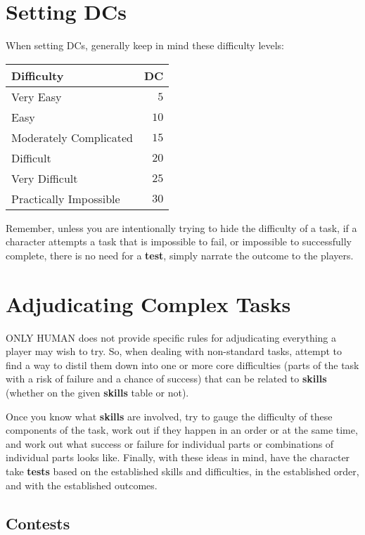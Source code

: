 \documentclass[11pt]{article}
\begin{document}
\begin{multicols}{3}
  \section*{Setting DCs}

  When setting DCs, generally keep in mind these difficulty levels:

  \begin{center}
    \begin{tabular}{ lr }
      Difficulty & DC \\
      \hline
      Very Easy & $5$ \\
      Easy & $10$ \\
      Moderately Complicated & $15$ \\
      Difficult & $20$ \\
      Very Difficult & $25$ \\
      Practically Impossible & $30$
    \end{tabular}
  \end{center}

  Remember, unless you are intentionally trying to hide the difficulty of a task, if a character attempts a task that is impossible to fail, or impossible to successfully complete, there is no need for a \textbf{test}, simply narrate the outcome to the players.

  \section*{Adjudicating Complex Tasks}

  ONLY HUMAN does not provide specific rules for adjudicating everything a player may wish to try. So, when dealing with non-standard tasks, attempt to find a way to distil them down into one or more core difficulties (parts of the task with a risk of failure and a chance of success) that can be related to \textbf{skills} (whether on the given \textbf{skills} table or not).

  Once you know what \textbf{skills} are involved, try to gauge the difficulty of these components of the task, work out if they happen in an order or at the same time, and work out what success or failure for individual parts or combinations of individual parts looks like. Finally, with these ideas in mind, have the character take \textbf{tests} based on the established skills and difficulties, in the established order, and with the established outcomes.

  \subsection*{Contests}


\end{multicols}
\end{document}

